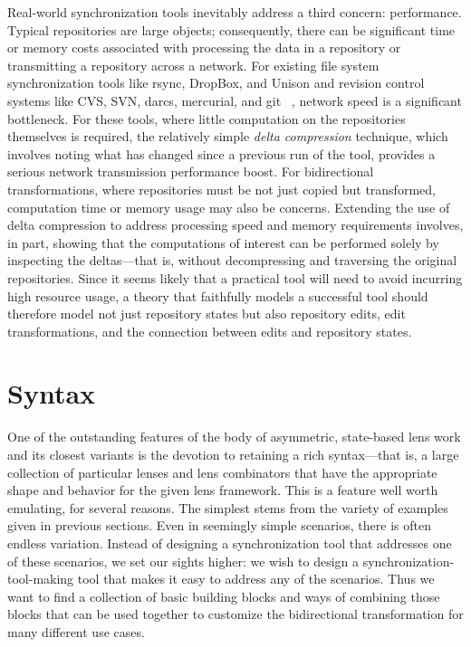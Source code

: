 Real-world synchronization tools inevitably address a third concern:
performance. Typical repositories are large objects; consequently, there can
be significant time or memory costs associated with processing the data in a
repository or transmitting a repository across a network. For existing file
system synchronization tools like rsync, DropBox, and Unison and revision
control systems like CVS, SVN, darcs, mercurial, and git~%
\cite{Tridgell96rsync,dropbox,pierce2004unison,berliner1990cvs,subversion,darcs,mercurial,git},
network speed is a significant bottleneck. For these tools, where little
computation on the repositories themselves is required, the relatively
simple \emph{delta compression} technique, which involves noting what has
changed since a previous run of the tool, provides a serious network
transmission performance boost. For bidirectional transformations, where
repositories must be not just copied but transformed, computation time or
memory usage may also be concerns. Extending the use of delta compression to
address processing speed and memory requirements involves, in part, showing
that the computations of interest can be performed solely by inspecting the
deltas---that is, without decompressing and traversing the original
repositories. Since it seems likely that a practical tool will need to avoid
incurring high resource usage, a theory that faithfully models a successful
tool should therefore model not just repository states but also repository
edits, edit transformations, and the connection between edits and repository
states.

\section{Syntax}
\label{sec:intro-syntax}

One of the outstanding features of the body of asymmetric, state-based lens
work and its closest variants is the devotion to retaining a rich
syntax---that is, a large collection of particular lenses and lens
combinators that have the appropriate shape and behavior for the given lens
framework. This is a feature well worth emulating, for several reasons. The
simplest stems from the variety of examples given in previous sections. Even
in seemingly simple scenarios, there is often endless variation. Instead of
designing a synchronization tool that addresses one of these scenarios, we
set our sights higher: we wish to design a synchronization-tool-making tool
that makes it easy to address any of the scenarios. Thus we want to find a
collection of basic building blocks and ways of combining those blocks that
can be used together to customize the bidirectional transformation for many
different use cases.

